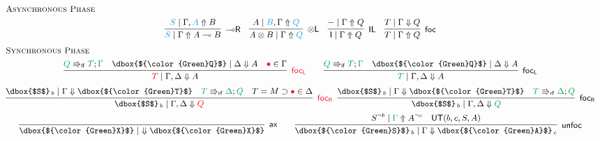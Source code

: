 \documentclass[runningheads]{llncs}
\newcommand{\tl}{\otimes \mathsf{L}}
\newcommand{\lright}{{\multimap}\mathsf{R}}
\newcommand{\unitl}{\mathsf{IL}}
\newcommand{\otL}{\tl}
\newcommand{\lolliR}{\lright}
\newcommand{\IL}{\unitl}
\newcommand{\ax}{\mathsf{ax}}
\newcommand{\ot}{\otimes}
\newcommand{\lolli}{\multimap}
\newcommand{\I}{\mathsf{I}}
\newcommand{\lf}{\Rrightarrow_\mathsf{lf}}
\newcommand{\rf}{\Rrightarrow_\mathsf{rf}}
\newcommand{\red}[1]{{\color{Red}#1}}
\newcommand{\blue}[1]{{\color{Cerulean}#1}}
\newcommand{\green}[1]{{\color{Green}#1}}
\newcommand{\UT}{\mathsf{UT}}
\newcommand{\up}{\Uparrow}
\newcommand{\dn}{\Downarrow}
\newcommand{\focL}{\mathsf{foc_L}}
\newcommand{\foc}{\mathsf{foc}}
\newcommand{\focR}{\mathsf{foc_R}}
\newcommand{\unfoc}{\mathsf{unfoc}}
\begin{document}
\begin{figure}[t]
  \[
  \small
  \begin{array}{c}
    \multicolumn{1}{l}{\text{\textsc{Asynchronous Phase}}} \\[4pt]
      \infer[\lolliR]{\blue{S} \mid \Gamma \up A \lolli B}{\blue{S} \mid \Gamma , \blue{A} \up B}
    \quad
    \infer[\otL]{A \ot B \mid \Gamma \up \blue{Q}}{A\mid  \blue{B} , \Gamma \up \blue{Q}}
    \quad
      \infer[\IL]{\I \mid \Gamma \up Q}{- \mid \Gamma \up Q}    
    \quad
        \infer[\foc]{T \mid \Gamma \up Q}{
      T \mid \Gamma \dn Q
    }
    \\[6pt]
    \multicolumn{1}{l}{\text{\textsc{Synchronous Phase}}} \\[4pt]
        \infer[\red{\focL}]{\red{T} \mid \Gamma , \Delta \dn A}{
          \green{Q} \lf \green{T} ; \green{\Gamma} &
          \dbox{$\green{Q}$} \mid \Delta \dn A
          & \red{\bullet} \in \Gamma
        }
    \qquad
        \infer[\focL]{\green{T} \mid \Gamma , \Delta \dn A}{
          \green{Q} \lf \green{T} ; \green{\Gamma} &
          \dbox{$\green{Q}$} \mid \Delta \dn A
        }
        \\[6pt]
    \infer[\red{\focR}]{\dbox{$S$}_{\, b} \mid \Gamma,\Delta \dn \red{Q}}{
      \dbox{$S$}_{\, b} \mid \Gamma \dn \dbox{$\green{T}$}
      &
      \green{T} \rf \green{\Delta} ; \green{Q}
      & T = M \supset \red{\bullet} \in \Delta
    }
    \;\;
    \infer[\focR]{\dbox{$S$}_{\, b} \mid \Gamma,\Delta \dn \green{Q}}{
      \dbox{$S$}_{\, b} \mid \Gamma \dn \dbox{$\green{T}$}
      &
      \green{T} \rf \green{\Delta} ; \green{Q}
    }
    \\[4pt]
        \infer[\ax]{\dbox{$\green{X}$} \mid ~ \dn \dbox{$\green{X}$}}{}
    \qquad
    \infer[\unfoc]{\dbox{$\green{S}$}_{\,b} \mid \Gamma \dn \dbox{$\green{A}$}_{\,c}}{
      S^{\neg b} \mid \green{\Gamma} \up A^{\neg c}
      &
      \UT(b,c,S,A)
    }

\end{array}\]
\end{figure}
\end{document}
